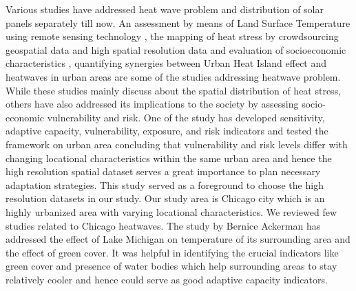 Various studies have addressed heat wave problem and distribution of solar panels separately till now. An assessment by means of Land Surface Temperature using remote sensing technology \cite{cotlier_extreme_2022}, the mapping of heat stress by crowdsourcing geospatial data and high spatial resolution data and evaluation of socioeconomic characteristics \cite{maragno_mapping_2020}, quantifying synergies between Urban Heat Island effect and heatwaves in urban areas \cite{founda_synergies_2017}  are some of the studies addressing heatwave problem. While these studies mainly discuss about the spatial distribution of heat stress, others have also addressed its implications to the society by assessing socio-economic vulnerability and risk. One of the study\cite{maragno_mapping_2020} has developed sensitivity, adaptive capacity, vulnerability, exposure, and risk indicators and tested the framework on urban area concluding that vulnerability and risk levels differ with changing locational characteristics within the same urban area and hence the high resolution spatial dataset serves a great importance to plan necessary adaptation strategies. This study served as a foreground to choose the high resolution datasets in our study. Our study area is Chicago city which is an highly urbanized area with varying locational characteristics. We reviewed few studies related to Chicago heatwaves. The study by Bernice Ackerman  has addressed the effect of Lake Michigan on temperature of its surrounding area and the effect of green cover. It was helpful in identifying the crucial indicators like green cover and presence of water bodies which help surrounding areas to stay relatively cooler and hence could serve as good adaptive capacity indicators.

